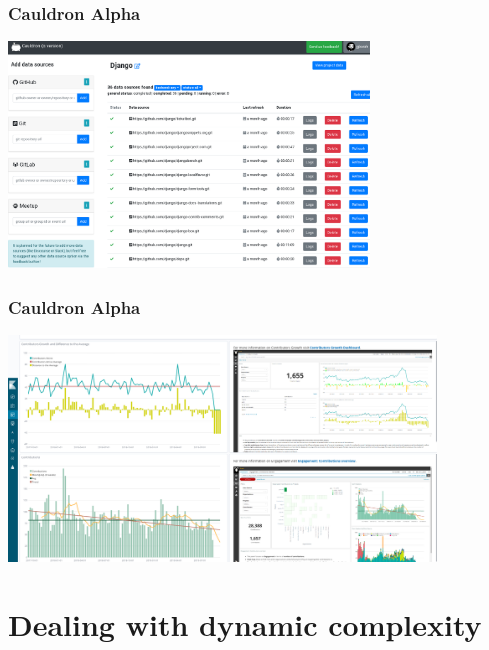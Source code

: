 \documentclass[17pt,aspectratio=169,hyperref=pdfusetitle]{beamer}
\begin{document}

\begin{frame}
\frametitle{Cauldron Alpha}

\begin{center}
\includegraphics[height=6cm]{figs/cauldron-dashboard}
\end{center}

\end{frame}


\begin{frame}
\frametitle{Cauldron Alpha}

\begin{center}
\includegraphics[height=6cm]{figs/cauldron-dashboard-2}
\end{center}

\end{frame}

\section{Dealing with dynamic complexity}

\end{document}
